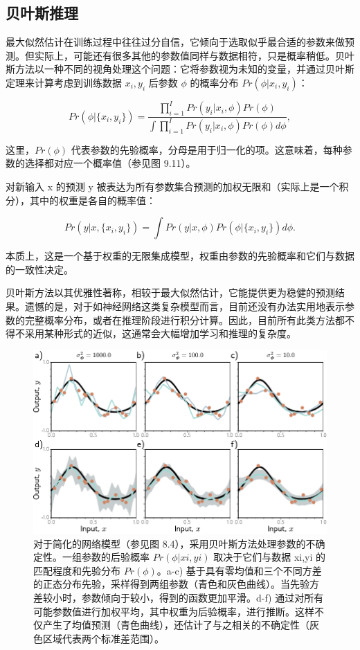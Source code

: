 \documentclass[lang=cn,newtx,10pt,scheme=chinese]{elegantbook}
\begin{document}
\subsection{贝叶斯推理}
最大似然估计在训练过程中往往过分自信，它倾向于选取似乎最合适的参数来做预测。但实际上，可能还有很多其他的参数值同样与数据相符，只是概率稍低。贝叶斯方法以一种不同的视角处理这个问题：它将参数视为未知的变量，并通过贝叶斯定理来计算考虑到训练数据 \({x_i, y_i}\) 后参数 \(\phi\) 的概率分布  \(Pr(\phi | {x_i, y_i})\)：

\begin{equation}
Pr(\phi | \{x_i, y_i\}) = \frac{\prod_{i=1}^{I} Pr(y_i|x_i, \phi)Pr(\phi)}{\int \prod_{i=1}^{I} Pr(y_i|x_i, \phi)Pr(\phi)d\phi}, 
\end{equation}

这里，\(Pr(\phi)\) 代表参数的先验概率，分母是用于归一化的项。这意味着，每种参数的选择都对应一个概率值（参见图 9.11）。

对新输入 x 的预测 y 被表达为所有参数集合预测的加权无限和（实际上是一个积分），其中的权重是各自的概率值：

\begin{equation}
Pr(y|x, \{x_i, y_i\}) = \int Pr(y|x, \phi)Pr(\phi | \{x_i, y_i\})d\phi. 
\end{equation}

本质上，这是一个基于权重的无限集成模型，权重由参数的先验概率和它们与数据的一致性决定。

贝叶斯方法以其优雅性著称，相较于最大似然估计，它能提供更为稳健的预测结果。遗憾的是，对于如神经网络这类复杂模型而言，目前还没有办法实用地表示参数的完整概率分布，或者在推理阶段进行积分计算。因此，目前所有此类方法都不得不采用某种形式的近似，这通常会大幅增加学习和推理的复杂度。

\begin{figure}[ht!]
	\centering
	\includegraphics[width=0.7\linewidth]{PDFFigures/UDLChap9PDF/RegBayesian.pdf}
	\caption{对于简化的网络模型（参见图 8.4），采用贝叶斯方法处理参数的不确定性。一组参数的后验概率 \(Pr(\phi|{xi,yi})\) 取决于它们与数据 {xi,yi} 的匹配程度和先验分布 \(Pr(\phi)\)。a-c) 基于具有零均值和三个不同方差的正态分布先验，采样得到两组参数（青色和灰色曲线）。当先验方差较小时，参数倾向于较小，得到的函数更加平滑。d-f) 通过对所有可能参数值进行加权平均，其中权重为后验概率，进行推断。这样不仅产生了均值预测（青色曲线），还估计了与之相关的不确定性（灰色区域代表两个标准差范围）。}
\end{figure}
\end{document}
